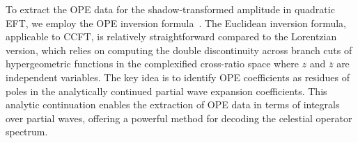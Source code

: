 To extract the OPE data for the shadow-transformed amplitude in quadratic EFT, we employ the OPE inversion formula~\cite{Caron-Huot:2017vep,Simmons-Duffin:2017nub,Mazac:2018qmi}. The Euclidean inversion formula, applicable to CCFT, is relatively straightforward compared to the Lorentzian version, which relies on computing the double discontinuity across branch cuts of hypergeometric functions in the complexified cross-ratio space where \(z\) and \(\bar{z}\) are independent variables.
The key idea is to identify OPE coefficients as residues of poles in the analytically continued partial wave expansion coefficients. %
This analytic continuation enables the extraction of OPE data in terms of integrals over partial waves, offering a powerful method for decoding the celestial operator spectrum.

